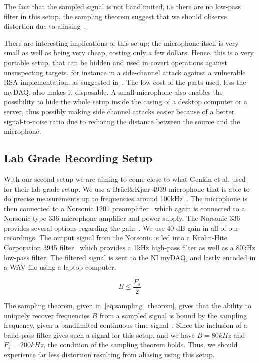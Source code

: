 The fact that the sampled signal is not bandlimited, i.e there are no low-pass filter in this setup, the sampling theorem suggest that we should observe distortion due to aliasing~\cite[pp. 384-394]{proakis2007digital}.

There are interesting implications of this setup; the microphone itself is very small as well as being very cheap, costing only a few dollars. 
Hence, this is a very portable setup, that can be hidden and used in covert operations against unsuspecting targets, for instance in a side-channel attack against a vulnerable RSA implementation, as suggested in~\cite{DBLP:conf/crypto/GenkinST14}.
The low cost of the parts used, less the myDAQ, also makes it disposable.
A small microphone also enables the possibility to hide the whole setup inside the casing of a desktop computer or a server, thus possibly making side channel attacks easier because of a better signal-to-noise ratio due to reducing the distance between the source and the microphone.


\subsection{Lab Grade Recording Setup}\label{chp3:sec:bruel_kjaer_configuration}
With our second setup we are aiming to come close to what Genkin et al. used for their lab-grade setup.
We use a Brüel\&Kjær 4939 microphone that is able to do precise measurements up to frequencies around 100kHz~\cite{url:bk4939_spec}.
The microphone is then connected to a Norsonic 1201 preamplifier~\cite{url:norsonic1201_spec} which again is connected to a Norsonic type 336 microphone amplifier and power supply.
The Norsonic 336 provides several options regarding the gain~\cite{url:nor336_spec}. 
We use 40 dB gain in all of our recordings.
The output signal from the Norsonic is led into a Krohn-Hite Corporation 3945 filter~\cite{url:krohn-hite3945_spec} which provides a 1kHz high-pass filter as well as a 80kHz low-pass filter.
The filtered signal is sent to the \gls{NI} myDAQ, and lastly encoded in a \gls{WAV} file using a laptop computer. 

\begin{equation}\label{eq:sampling_theorem}
B \leq \frac{F_{s}}{2}
\end{equation}

The sampling theorem, given in~\autoref{eq:sampling_theorem}, gives that the ability to uniquely recover frequencies $B$ from a sampled signal is bound by the sampling frequency, given a bandlimited continuous-time signal~\cite[pp. 384-394]{proakis2007digital}.
Since the inclusion of a band-pass filter gives such a signal for this setup, and we have $B = 80kHz$ and $F_s = 200kHz$, the condition of the sampling theorem holds.
Thus, we should experience far less distortion resulting from aliasing using this setup.


